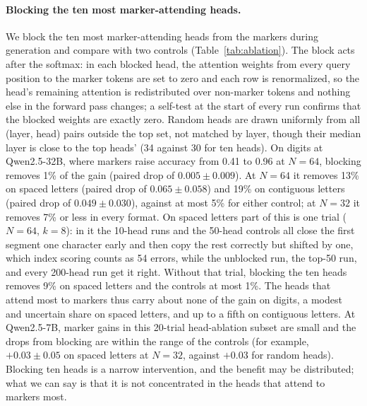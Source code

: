 \documentclass[10pt]{article} %
\newcommand{\task}[1]{\texttt{#1}}
\begin{document}
\begin{table}[t]
\centering
\small
\caption{Head ablation at Qwen2.5-32B (\task{random\_permutation}, $A = 8$, 20 trials per cell, pooled over $k \in \{2, 8\}$). ``Top 10'': the ten most marker-attending heads, chosen on held-out trials, are blocked from attending to markers (weights zeroed, rows renormalized). Controls: ten random heads blocked from markers, and the top ten blocked from as many random non-marker input tokens (sham). Share of gain removed is $(\text{Markers} - \text{blocked}) / (\text{Markers} - \text{No markers})$; ``Controls'' gives the larger of the two control shares. Bold: shares of 10\% or more removed by the top ten heads.}
\label{tab:ablation}

\end{table}

\paragraph{Blocking the ten most marker-attending heads.} We block the ten most marker-attending heads from the markers during generation and compare with two controls (Table~\ref{tab:ablation}). The block acts after the softmax: in each blocked head, the attention weights from every query position to the marker tokens are set to zero and each row is renormalized, so the head's remaining attention is redistributed over non-marker tokens and nothing else in the forward pass changes; a self-test at the start of every run confirms that the blocked weights are exactly zero. Random heads are drawn uniformly from all (layer, head) pairs outside the top set, not matched by layer, though their median layer is close to the top heads' (34 against 30 for ten heads). On digits at Qwen2.5-32B, where markers raise accuracy from 0.41 to 0.96 at $N = 64$, blocking removes 1\% of the gain (paired drop of $0.005 \pm 0.009$). At $N = 64$ it removes 13\% on spaced letters (paired drop of $0.065 \pm 0.058$) and 19\% on contiguous letters (paired drop of $0.049 \pm 0.030$), against at most 5\% for either control; at $N = 32$ it removes 7\% or less in every format. On spaced letters part of this is one trial ($N = 64$, $k = 8$): in it the 10-head runs and the 50-head controls all close the first segment one character early and then copy the rest correctly but shifted by one, which index scoring counts as 54 errors, while the unblocked run, the top-50 run, and every 200-head run get it right. Without that trial, blocking the ten heads removes 9\% on spaced letters and the controls at most 1\%. The heads that attend most to markers thus carry about none of the gain on digits, a modest and uncertain share on spaced letters, and up to a fifth on contiguous letters. At Qwen2.5-7B, marker gains in this 20-trial head-ablation subset are small and the drops from blocking are within the range of the controls (for example, $+0.03 \pm 0.05$ on spaced letters at $N = 32$, against $+0.03$ for random heads). Blocking ten heads is a narrow intervention, and the benefit may be distributed; what we can say is that it is not concentrated in the heads that attend to markers most.
\end{document}
